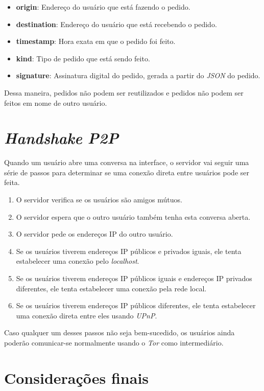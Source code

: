\begin{itemize}
    \item \textbf{origin}: Endereço do usuário que está fazendo o pedido.
    \item \textbf{destination}: Endereço do usuário que está recebendo o pedido.
    \item \textbf{timestamp}: Hora exata em que o pedido foi feito.
    \item \textbf{kind}: Tipo de pedido que está sendo feito.
    \item \textbf{signature}: Assinatura digital do pedido, gerada a partir do \textit{JSON} do pedido.
\end{itemize}

Dessa maneira, pedidos não podem ser reutilizados e pedidos não podem ser feitos em nome de outro usuário.

\section{\textit{Handshake} \textit{P2P}}

Quando um usuário abre uma conversa na interface, o servidor vai seguir uma série de passos para determinar se uma conexão direta entre usuários pode ser feita.
\begin{enumerate}
    \item O servidor verifica se os usuários são amigos mútuos.
    \item O servidor espera que o outro usuário também tenha esta conversa aberta.
    \item O servidor pede os endereços IP do outro usuário.
    \item Se os usuários tiverem endereços IP públicos e privados iguais, ele tenta estabelecer uma conexão pelo \textit{localhost}.
    \item Se os usuários tiverem endereços IP públicos iguais e endereços IP privados diferentes, ele tenta estabelecer uma conexão pela rede local.
    \item Se os usuários tiverem endereços IP públicos diferentes, ele tenta estabelecer uma conexão direta entre eles usando \textit{UPnP}.
\end{enumerate}

Caso qualquer um desses passos não seja bem-sucedido, os usuários ainda poderão comunicar-se normalmente usando o \textit{Tor} como intermediário.

\section{Considerações finais}

